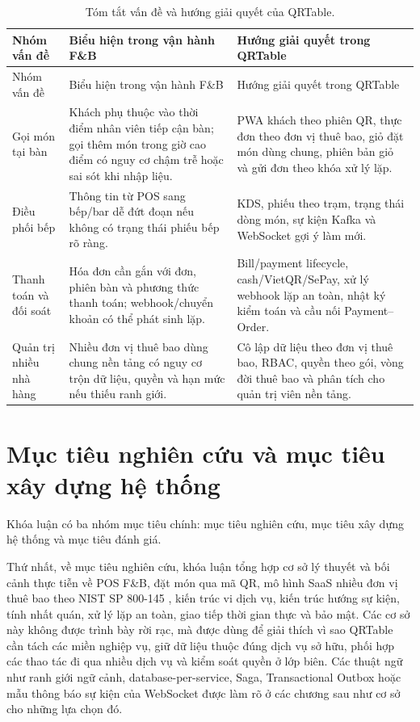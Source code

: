 {\footnotesize\sloppy
\setlength{\tabcolsep}{3pt}
\begin{longtable}{>{\raggedright\arraybackslash}p{}>{\raggedright\arraybackslash}p{}>{\raggedright\arraybackslash}p{}}
  \caption{Tóm tắt vấn đề và hướng giải quyết của QRTable.}
  \label{tab:chapter1-problem-solution}\\
  \toprule
  Nhóm vấn đề & Biểu hiện trong vận hành F\&B & Hướng giải quyết trong QRTable \\
  \midrule
  \endfirsthead
  \toprule
  Nhóm vấn đề & Biểu hiện trong vận hành F\&B & Hướng giải quyết trong QRTable \\
  \midrule
  \endhead
  \bottomrule
  \endfoot
  Gọi món tại bàn & Khách phụ thuộc vào thời điểm nhân viên tiếp cận bàn; gọi thêm món trong giờ cao điểm có nguy cơ chậm trễ hoặc sai sót khi nhập liệu. & PWA khách theo phiên QR, thực đơn theo đơn vị thuê bao, giỏ đặt món dùng chung, phiên bản giỏ và gửi đơn theo khóa xử lý lặp. \\
  \addlinespace
  Điều phối bếp & Thông tin từ POS sang bếp/bar dễ đứt đoạn nếu không có trạng thái phiếu bếp rõ ràng. & KDS, phiếu theo trạm, trạng thái dòng món, sự kiện Kafka và WebSocket gợi ý làm mới. \\
  \addlinespace
  Thanh toán và đối soát & Hóa đơn cần gắn với đơn, phiên bàn và phương thức thanh toán; webhook/chuyển khoản có thể phát sinh lặp. & Bill/payment lifecycle, cash/VietQR/SePay, xử lý webhook lặp an toàn, nhật ký kiểm toán và cầu nối Payment--Order. \\
  \addlinespace
  Quản trị nhiều nhà hàng & Nhiều đơn vị thuê bao dùng chung nền tảng có nguy cơ trộn dữ liệu, quyền và hạn mức nếu thiếu ranh giới. & Cô lập dữ liệu theo đơn vị thuê bao, RBAC, quyền theo gói, vòng đời thuê bao và phân tích cho quản trị viên nền tảng. \\
\end{longtable}
}

\section{Mục tiêu nghiên cứu và mục tiêu xây dựng hệ thống}

Khóa luận có ba nhóm mục tiêu chính: mục tiêu nghiên cứu, mục tiêu xây dựng hệ thống và mục tiêu đánh giá.

Thứ nhất, về mục tiêu nghiên cứu, khóa luận tổng hợp cơ sở lý thuyết và bối cảnh thực tiễn về POS F\&B, đặt món qua mã QR, mô hình SaaS nhiều đơn vị thuê bao theo NIST SP 800-145 \cite{nist-sp800145-2011}, kiến trúc vi dịch vụ, kiến trúc hướng sự kiện, tính nhất quán, xử lý lặp an toàn, giao tiếp thời gian thực và bảo mật. Các cơ sở này không được trình bày rời rạc, mà được dùng để giải thích vì sao QRTable cần tách các miền nghiệp vụ, giữ dữ liệu thuộc đúng dịch vụ sở hữu, phối hợp các thao tác đi qua nhiều dịch vụ và kiểm soát quyền ở lớp biên. Các thuật ngữ như ranh giới ngữ cảnh, database-per-service, Saga, Transactional Outbox hoặc mẫu thông báo sự kiện của WebSocket \cite{fowler-event-driven-2017} được làm rõ ở các chương sau như cơ sở cho những lựa chọn đó.

